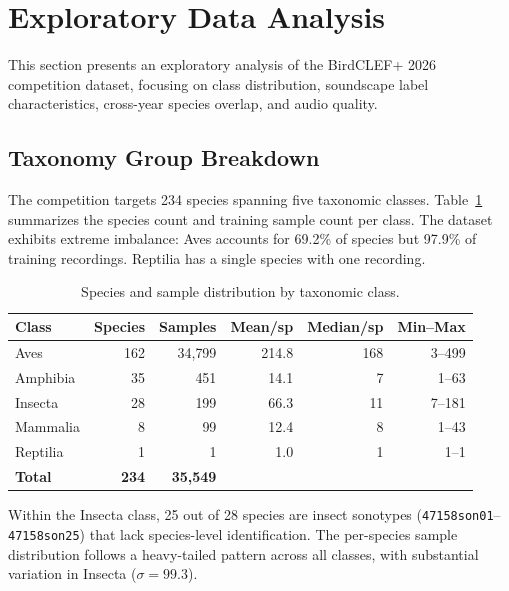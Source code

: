 \section{Exploratory Data Analysis}
\label{sec:eda}

This section presents an exploratory analysis of the BirdCLEF+ 2026 competition dataset,
focusing on class distribution, soundscape label characteristics, cross-year species overlap,
and audio quality.

\subsection{Taxonomy Group Breakdown}
\label{sec:eda:taxonomy}

The competition targets 234 species spanning five taxonomic classes.
Table~\ref{tab:taxonomy} summarizes the species count and training sample count per class.
The dataset exhibits extreme imbalance: Aves accounts for 69.2\% of species but 97.9\% of
training recordings. Reptilia has a single species with one recording.

\begin{table}[h]
\centering
\caption{Species and sample distribution by taxonomic class.}
\label{tab:taxonomy}
\begin{tabular}{lrrrrr}
\hline
\textbf{Class} & \textbf{Species} & \textbf{Samples} & \textbf{Mean/sp} & \textbf{Median/sp} & \textbf{Min--Max} \\
\hline
Aves     & 162 & 34{,}799 & 214.8 & 168 & 3--499 \\
Amphibia &  35 &     451 &  14.1 &   7 & 1--63 \\
Insecta  &  28 &     199 &  66.3 &  11 & 7--181 \\
Mammalia &   8 &      99 &  12.4 &   8 & 1--43 \\
Reptilia &   1 &       1 &   1.0 &   1 & 1--1 \\
\hline
\textbf{Total} & \textbf{234} & \textbf{35{,}549} & & & \\
\hline
\end{tabular}
\end{table}

Within the Insecta class, 25 out of 28 species are insect sonotypes (\texttt{47158son01}--\texttt{47158son25})
that lack species-level identification. The per-species sample distribution follows a heavy-tailed pattern
across all classes, with substantial variation in Insecta ($\sigma = 99.3$).

